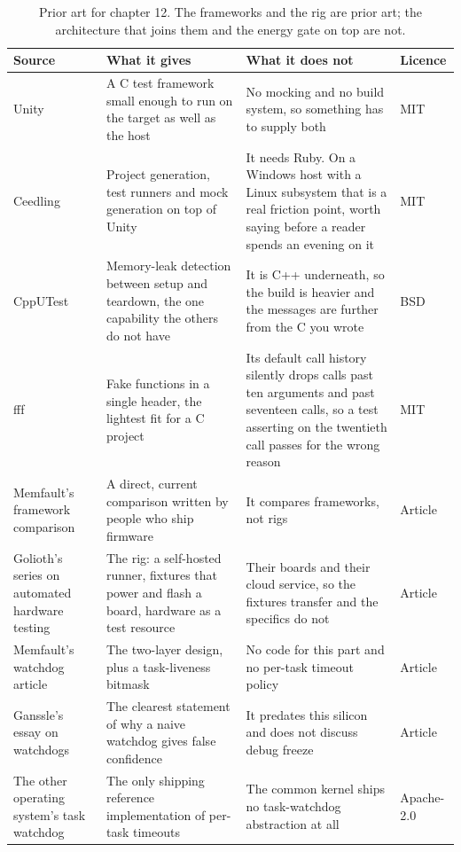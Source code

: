\begin{table}[H]\centering\small
\begin{tabular}{p{32mm}p{46mm}p{40mm}p{20mm}}
\toprule
Source & What it gives & What it does not & Licence \\
\midrule
Unity & A C test framework small enough to run on the target as well as the host & No mocking and no build system, so something has to supply both & MIT \\
Ceedling & Project generation, test runners and mock generation on top of Unity & It needs Ruby. On a Windows host with a Linux subsystem that is a real friction point, worth saying before a reader spends an evening on it & MIT \\
CppUTest & Memory-leak detection between setup and teardown, the one capability the others do not have & It is C++ underneath, so the build is heavier and the messages are further from the C you wrote & BSD \\
fff & Fake functions in a single header, the lightest fit for a C project & Its default call history silently drops calls past ten arguments and past seventeen calls, so a test asserting on the twentieth call passes for the wrong reason & MIT \\
Memfault's framework comparison & A direct, current comparison written by people who ship firmware & It compares frameworks, not rigs & Article \\
Golioth's series on automated hardware testing & The rig: a self-hosted runner, fixtures that power and flash a board, hardware as a test resource & Their boards and their cloud service, so the fixtures transfer and the specifics do not & Article \\
Memfault's watchdog article & The two-layer design, plus a task-liveness bitmask & No code for this part and no per-task timeout policy & Article \\
Ganssle's essay on watchdogs & The clearest statement of why a naive watchdog gives false confidence & It predates this silicon and does not discuss debug freeze & Article \\
The other operating system's task watchdog & The only shipping reference implementation of per-task timeouts & The common kernel ships no task-watchdog abstraction at all & Apache-2.0 \\
\bottomrule
\end{tabular}
\caption{Prior art for chapter 12. The frameworks and the rig are prior art; the architecture that joins them and the energy gate on top are not.}
\end{table}

